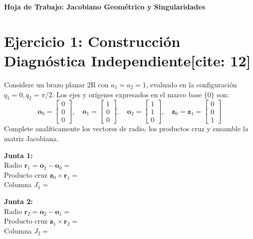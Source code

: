 \documentclass[11pt, a4paper]{article}
\begin{document}
\begin{center}
    \Large\textbf{\textcolor{ucbblue}{Hoja de Trabajo: Jacobiano Geométrico y Singularidades}}\\[0.2cm]
\end{center}

\vspace{0.2cm}

\section*{Ejercicio 1: Construcción Diagnóstica Independiente[cite: 12]}
Considere un brazo planar 2R con $a_1=a_2=1$, evaluado en la configuración $q_1=0, q_2=\pi/2$. Los ejes y orígenes expresados en el marco base $\{0\}$ son:
\begin{equation*}
    \mathbf{o}_0=\begin{bmatrix}0\\0\\0\end{bmatrix}, \quad \mathbf{o}_1=\begin{bmatrix}1\\0\\0\end{bmatrix}, \quad \mathbf{o}_2=\begin{bmatrix}1\\1\\0\end{bmatrix}, \quad \mathbf{z}_0=\mathbf{z}_1=\begin{bmatrix}0\\0\\1\end{bmatrix}
\end{equation*}
Complete analíticamente los vectores de radio, los productos cruz y ensamble la matriz Jacobiana.

\textbf{Junta 1:} \\
Radio $\mathbf{r}_1 = \mathbf{o}_2 - \mathbf{o}_0 =$ \underline{\hspace{4cm}} \\
Producto cruz $\mathbf{z}_0 \times \mathbf{r}_1 =$ \underline{\hspace{4cm}} \\
Columna $J_1 =$ \underline{\hspace{5cm}}

\vspace{0.4cm}
\textbf{Junta 2:} \\
Radio $\mathbf{r}_2 = \mathbf{o}_2 - \mathbf{o}_1 =$ \underline{\hspace{4cm}} \\
Producto cruz $\mathbf{z}_1 \times \mathbf{r}_2 =$ \underline{\hspace{4cm}} \\
Columna $J_2 =$ \underline{\hspace{5cm}}
\end{document}
